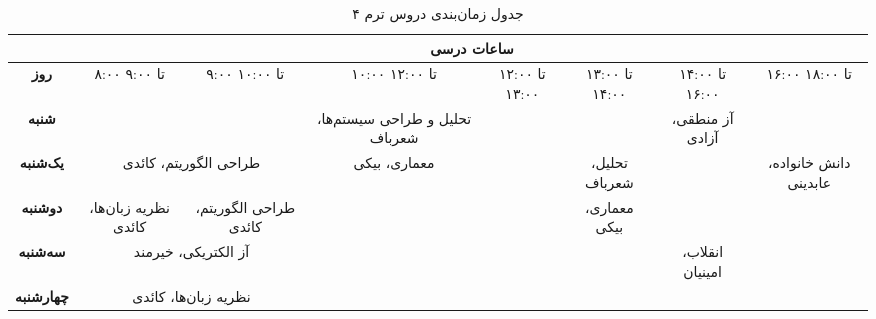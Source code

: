 \documentclass{article}
\begin{document}
	
 	\begin{sidewaystable}[h]
		\begin{center}	
 			\caption{جدول زمان‌بندی دروس ترم ۴}	
			\begin{tabular}{|c|c|c|c|c|c|c|c|c|c|c|}
				\cline{2-11}
				\multicolumn{1}{c}{}
				& \multicolumn{10}{|c|}{\textbf{ساعات درسی}} \\ \hline
			   \textbf{روز} & ۸:۰۰	 تا ۹:۰۰ & ۹:۰۰ تا ۱۰:۰۰ &
     			\multicolumn{2}{|c|}{۱۰:۰۰ تا ۱۲:۰۰} &
     			۱۲:۰۰ تا ۱۳:۰۰ & ۱۳:۰۰ تا ۱۴:۰۰ &
				\multicolumn{2}{|c|}{۱۴:۰۰ تا ۱۶:۰۰} &
				\multicolumn{2}{|c|}{۱۶:۰۰ تا ۱۸:۰۰} \\
				\hline
				\hline
				
				\textbf{شنبه} &
				\multicolumn{2}{|c|}{} &
				\multicolumn{2}{|c|}{تحلیل و طراحی سیستم‌ها، شعرباف} &
				\multicolumn{2}{|c|}{} &
				\multicolumn{2}{|c|}{آز منطقی، آزادی} &
				\multicolumn{2}{|c|}{} \\
				\hline
				
				\textbf{یک‌شنبه} &
				\multicolumn{2}{|c|}{طراحی الگوریتم، کائدی} &
				\multicolumn{2}{|c|}{معماری، بیکی} &
				 & تحلیل، شعرباف &
				\multicolumn{2}{|c|}{} &
				\multicolumn{2}{|c|}{دانش خانواده، عابدینی} \\
				\hline
				\textbf{دوشنبه} &
				نظریه زبان‌ها، کائدی & طراحی الگوریتم، کائدی &
				\multicolumn{2}{|c|}{} &
				& معماری، بیکی &
				\multicolumn{2}{|c|}{} &
				\multicolumn{2}{|c|}{} \\
				\hline
				
				\textbf{سه‌شنبه} &
				\multicolumn{2}{|c|}{آز الکتریکی، خیرمند} &
                \multicolumn{2}{|c|}{} &
				\multicolumn{2}{|c|}{} &
				\multicolumn{2}{|c|}{انقلاب، امینیان} &
				\multicolumn{2}{|c|}{} \\
				\hline
				
				\textbf{چهارشنبه} &
				\multicolumn{2}{|c|}{نظریه زبان‌ها، کائدی} &
				\multicolumn{2}{|c|}{} &
				\multicolumn{2}{|c|}{} &
				\multicolumn{2}{|c|}{} &
				\multicolumn{2}{|c|}{} \\
				\hline
            \end{tabular}
		\end{center}
 	\end{sidewaystable}
\end{document}
